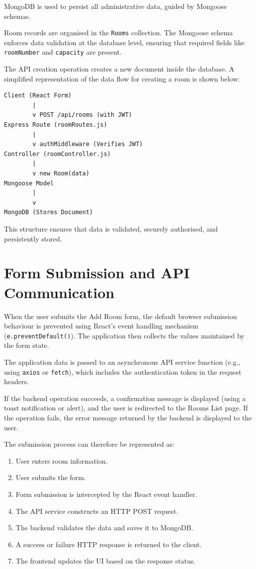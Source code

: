 MongoDB is used to persist all administrative data, guided by Mongoose schemas.

Room records are organised in the \texttt{Rooms} collection. The Mongoose schema enforces data validation at the database level, ensuring that required fields like \texttt{roomNumber} and \texttt{capacity} are present.

The API creation operation creates a new document inside the database. A simplified representation of the data flow for creating a room is shown below:

\begin{verbatim}
Client (React Form)
        |
        v POST /api/rooms (with JWT)
Express Route (roomRoutes.js)
        |
        v authMiddleware (Verifies JWT)
Controller (roomController.js)
        |
        v new Room(data)
Mongoose Model
        |
        v
MongoDB (Stores Document)
\end{verbatim}

This structure ensures that data is validated, securely authorised, and persistently stored.

\section{Form Submission and API Communication}

When the user submits the Add Room form, the default browser submission behaviour is prevented using React's event handling mechanism (\texttt{e.preventDefault()}). The application then collects the values maintained by the form state.

The application data is passed to an asynchronous API service function (e.g., using \texttt{axios} or \texttt{fetch}), which includes the authentication token in the request headers.

If the backend operation succeeds, a confirmation message is displayed (using a toast notification or alert), and the user is redirected to the Rooms List page. If the operation fails, the error message returned by the backend is displayed to the user.

The submission process can therefore be represented as:

\begin{enumerate}
    \item User enters room information.
    \item User submits the form.
    \item Form submission is intercepted by the React event handler.
    \item The API service constructs an HTTP POST request.
    \item The backend validates the data and saves it to MongoDB.
    \item A success or failure HTTP response is returned to the client.
    \item The frontend updates the UI based on the response status.
\end{enumerate}

